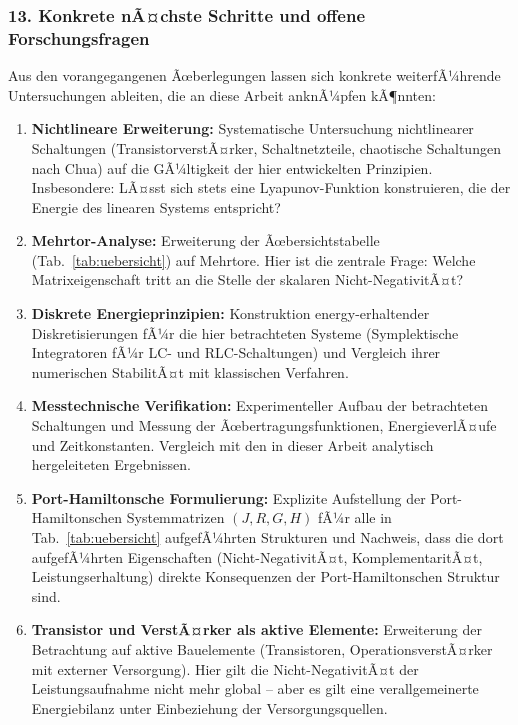 ﻿\documentclass[12pt, a4paper]{article}
\begin{document}
	\subsubsection*{13. \quad Konkrete nÃ¤chste Schritte und offene Forschungsfragen}

	Aus den vorangegangenen Ãœberlegungen lassen sich konkrete weiterfÃ¼hrende Untersuchungen ableiten, die an diese Arbeit anknÃ¼pfen kÃ¶nnten:

	\begin{enumerate}
		\item \textbf{Nichtlineare Erweiterung:} Systematische Untersuchung nichtlinearer Schaltungen (TransistorverstÃ¤rker, Schaltnetzteile, chaotische Schaltungen nach Chua) auf die GÃ¼ltigkeit der hier entwickelten Prinzipien. Insbesondere: LÃ¤sst sich stets eine Lyapunov-Funktion konstruieren, die der Energie des linearen Systems entspricht?

		\item \textbf{Mehrtor-Analyse:} Erweiterung der Ãœbersichtstabelle (Tab.~\ref{tab:uebersicht}) auf Mehrtore. Hier ist die zentrale Frage: Welche Matrixeigenschaft tritt an die Stelle der skalaren Nicht-NegativitÃ¤t?

		\item \textbf{Diskrete Energieprinzipien:} Konstruktion energy-erhaltender Diskretisierungen fÃ¼r die hier betrachteten Systeme (Symplektische Integratoren fÃ¼r LC- und RLC-Schaltungen) und Vergleich ihrer numerischen StabilitÃ¤t mit klassischen Verfahren.

		\item \textbf{Messtechnische Verifikation:} Experimenteller Aufbau der betrachteten Schaltungen und Messung der Ãœbertragungsfunktionen, EnergieverlÃ¤ufe und Zeitkonstanten. Vergleich mit den in dieser Arbeit analytisch hergeleiteten Ergebnissen.

		\item \textbf{Port-Hamiltonsche Formulierung:} Explizite Aufstellung der Port-Hamiltonschen Systemmatrizen $(J, R, G, H)$ fÃ¼r alle in Tab.~\ref{tab:uebersicht} aufgefÃ¼hrten Strukturen und Nachweis, dass die dort aufgefÃ¼hrten Eigenschaften (Nicht-NegativitÃ¤t, KomplementaritÃ¤t, Leistungserhaltung) direkte Konsequenzen der Port-Hamiltonschen Struktur sind.

		\item \textbf{Transistor und VerstÃ¤rker als aktive Elemente:} Erweiterung der Betrachtung auf aktive Bauelemente (Transistoren, OperationsverstÃ¤rker mit externer Versorgung). Hier gilt die Nicht-NegativitÃ¤t der Leistungsaufnahme nicht mehr global -- aber es gilt eine verallgemeinerte Energiebilanz unter Einbeziehung der Versorgungsquellen.


\end{enumerate}
\end{document}
